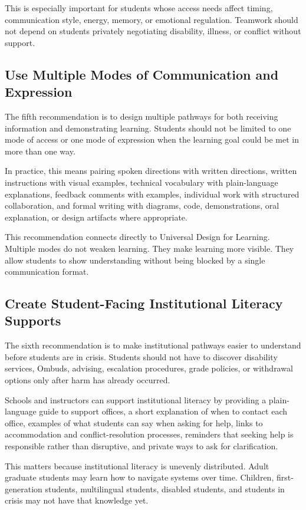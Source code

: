 \documentclass[12pt]{article}
\begin{document}
This is especially important for students whose access needs affect timing, communication style, energy, memory, or emotional regulation. Teamwork should not depend on students privately negotiating disability, illness, or conflict without support.

\subsection*{Use Multiple Modes of Communication and Expression}

The fifth recommendation is to design multiple pathways for both receiving information and demonstrating learning. Students should not be limited to one mode of access or one mode of expression when the learning goal could be met in more than one way.

In practice, this means pairing spoken directions with written directions, written instructions with visual examples, technical vocabulary with plain-language explanations, feedback comments with examples, individual work with structured collaboration, and formal writing with diagrams, code, demonstrations, oral explanation, or design artifacts where appropriate.

This recommendation connects directly to Universal Design for Learning. Multiple modes do not weaken learning. They make learning more visible. They allow students to show understanding without being blocked by a single communication format.

\subsection*{Create Student-Facing Institutional Literacy Supports}

The sixth recommendation is to make institutional pathways easier to understand before students are in crisis. Students should not have to discover disability services, Ombuds, advising, escalation procedures, grade policies, or withdrawal options only after harm has already occurred.

Schools and instructors can support institutional literacy by providing a plain-language guide to support offices, a short explanation of when to contact each office, examples of what students can say when asking for help, links to accommodation and conflict-resolution processes, reminders that seeking help is responsible rather than disruptive, and private ways to ask for clarification.

This matters because institutional literacy is unevenly distributed. Adult graduate students may learn how to navigate systems over time. Children, first-generation students, multilingual students, disabled students, and students in crisis may not have that knowledge yet.
\end{document}
